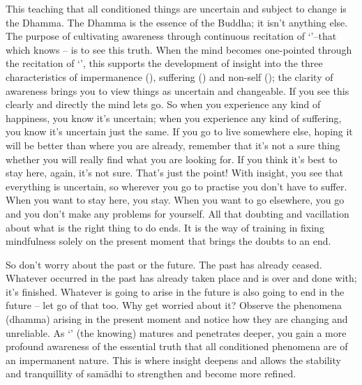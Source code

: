 This teaching that all conditioned things are uncertain and subject to change is the Dhamma. The Dhamma is the essence of the Buddha; it isn't anything else. The purpose of cultivating awareness through continuous recitation of  `'--that which knows -- is to see this truth. When the mind becomes one-pointed through the recitation of `', this supports the development of insight into the three characteristics of impermanence (), suffering () and non-self (); the clarity of awareness brings you to view things as uncertain and changeable. If you see this clearly and directly the mind lets go. So when you experience any kind of happiness, you know it's uncertain; when you experience any kind of suffering, you know it's uncertain just the same. If you go to live somewhere else, hoping it will be better than where you are already, remember that it's not a sure thing whether you will really find what you are looking for. If you think it's best to stay here, again, it's not sure. That's just the point! With insight, you see that everything is uncertain, so wherever you go to practise you don't have to suffer. When you want to stay here, you stay. When you want to go elsewhere, you go and you don't make any problems for yourself. All that doubting and vacillation about what is the right thing to do ends. It is the way of training in fixing mindfulness solely on the present moment that brings the doubts to an end.

So don't worry about the past or the future. The past has already ceased. Whatever occurred in the past has already taken place and is over and done with; it's finished. Whatever is going to arise in the future is also going to end in the future -- let go of that too. Why get worried about it? Observe the phenomena (dhamma) arising in the present moment and notice how they are changing and unreliable. As `' (the knowing) matures and penetrates deeper, you gain a more profound awareness of the essential truth that all conditioned phenomena are of an impermanent nature. This is where insight deepens and allows the stability and tranquillity of sam\=adhi to strengthen and become more refined.

